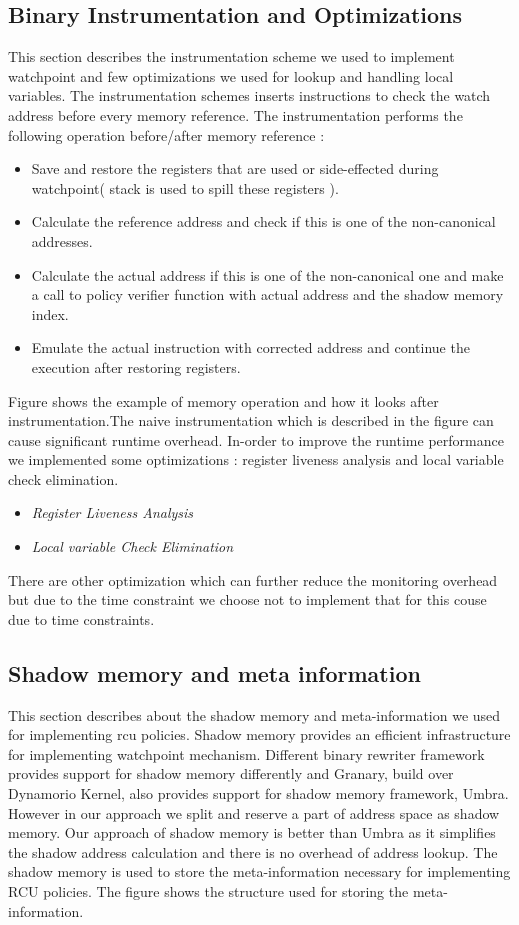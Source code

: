 \subsection {Binary Instrumentation and Optimizations}

This section describes the instrumentation scheme we used to implement watchpoint and few optimizations we used for lookup and handling local variables. The instrumentation schemes inserts instructions to check the watch address before every memory reference. The instrumentation performs the following operation before/after memory reference :

\begin{itemize}
\item Save and restore the registers that are used or side-effected during watchpoint( stack is used to spill these registers ).
\item Calculate the reference address and check if this is one of the non-canonical addresses.
\item Calculate the actual address if this is one of the non-canonical one and make a call to policy verifier function with actual address and the shadow memory index. 
\item Emulate the actual instruction with corrected address and continue the execution after restoring registers.
\end{itemize}

Figure shows the example of memory operation and how it looks after instrumentation.The naive instrumentation which is described in the figure can cause significant runtime overhead. In-order to improve the runtime performance we implemented some optimizations : register liveness analysis and local variable check elimination. 

\begin{itemize}
\item \emph{Register Liveness Analysis}
\item \emph{Local variable Check Elimination}
\end{itemize} 

There are other optimization which can further reduce the monitoring overhead but due to the time constraint we choose not to implement that for this couse due to time constraints.


\subsection{Shadow memory and meta information}
This section describes about the shadow memory and meta-information we used for implementing rcu policies. Shadow memory provides an efficient infrastructure for implementing watchpoint mechanism. Different binary rewriter framework provides support for shadow memory differently and Granary, build over Dynamorio Kernel, also provides support for shadow memory framework, Umbra. However in our approach we split and reserve a part of address space as shadow memory. Our approach of shadow memory is better than Umbra as it simplifies the shadow address calculation and there is no overhead of address lookup. The shadow memory is used to store the meta-information necessary for implementing RCU policies. The figure shows the structure used for storing the meta-information. 


